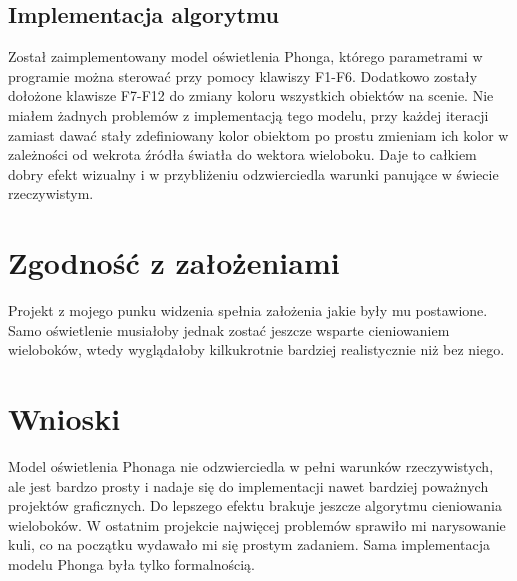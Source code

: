 \documentclass[a4paper,11pt,notitlepage]{article}
\begin{document}
\subsection{Implementacja algorytmu}

Został zaimplementowany model oświetlenia Phonga, którego parametrami w programie można sterować przy pomocy klawiszy F1-F6. Dodatkowo zostały dołożone klawisze F7-F12 do zmiany koloru wszystkich obiektów na scenie. Nie miałem żadnych problemów z implementacją tego modelu, przy każdej iteracji zamiast dawać stały zdefiniowany kolor obiektom po prostu zmieniam ich kolor w zależności od wekrota źródła światła do wektora wieloboku. Daje to całkiem dobry efekt wizualny i w przybliżeniu odzwierciedla warunki panujące w świecie rzeczywistym.

\section{Zgodność z założeniami}

Projekt z mojego punku widzenia spełnia założenia jakie były mu postawione. Samo oświetlenie musiałoby jednak zostać jeszcze wsparte cieniowaniem wieloboków, wtedy wyglądałoby kilkukrotnie bardziej realistycznie niż bez niego.

\section{Wnioski}

Model oświetlenia Phonaga nie odzwierciedla w pełni warunków rzeczywistych, ale jest bardzo prosty i nadaje się do implementacji nawet bardziej poważnych projektów graficznych. Do lepszego efektu brakuje jeszcze algorytmu cieniowania wieloboków. W ostatnim projekcie najwięcej problemów sprawiło mi narysowanie kuli, co na początku wydawało mi się prostym zadaniem. Sama implementacja modelu Phonga była tylko formalnością.
\end{document}
